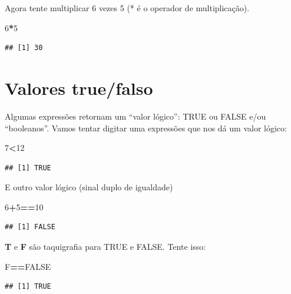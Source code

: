 \documentclass[]{book}
\newenvironment{Shaded}{\begin{snugshade}}{\end{snugshade}}
\newcommand{\DecValTok}[1]{\textcolor[rgb]{0.00,0.00,0.81}{#1}}
\newcommand{\NormalTok}[1]{#1}
\newcommand{\OperatorTok}[1]{\textcolor[rgb]{0.81,0.36,0.00}{\textbf{#1}}}
\newcommand{\OtherTok}[1]{\textcolor[rgb]{0.56,0.35,0.01}{#1}}
\begin{document}
Agora tente multiplicar 6 vezes 5 (* é o operador de multiplicação).

\begin{Shaded}
\begin{Highlighting}[]
\DecValTok{6}\OperatorTok{*}\DecValTok{5}
\end{Highlighting}
\end{Shaded}

\begin{verbatim}
## [1] 30
\end{verbatim}

\hypertarget{valores-truefalso}{%
\section{Valores true/falso}\label{valores-truefalso}}

Algumas expressões retornam um ``valor lógico'': TRUE ou FALSE e/ou ``booleanos''.
Vamos tentar digitar uma expressões que nos dá um valor lógico:

\begin{Shaded}
\begin{Highlighting}[]
\DecValTok{7}\OperatorTok{<}\DecValTok{12}
\end{Highlighting}
\end{Shaded}

\begin{verbatim}
## [1] TRUE
\end{verbatim}

E outro valor lógico (sinal duplo de igualdade)

\begin{Shaded}
\begin{Highlighting}[]
\DecValTok{6}\OperatorTok{+}\DecValTok{5}\OperatorTok{==}\DecValTok{10}
\end{Highlighting}
\end{Shaded}

\begin{verbatim}
## [1] FALSE
\end{verbatim}

\textbf{T} e \textbf{F} são taquigrafia para TRUE e FALSE. Tente isso:

\begin{Shaded}
\begin{Highlighting}[]
\NormalTok{F}\OperatorTok{==}\OtherTok{FALSE}
\end{Highlighting}
\end{Shaded}

\begin{verbatim}
## [1] TRUE
\end{verbatim}
\end{document}
